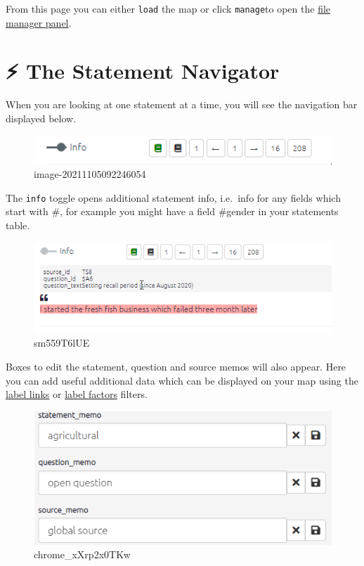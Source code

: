 \documentclass[
]{book}
\begin{document}
From this page you can either \texttt{load} the map or click \texttt{manage}to open the \protect\hyperlink{xpermissions}{file manager panel}.

\hypertarget{xstatement-nav}{%
\chapter{⚡ The Statement Navigator}\label{xstatement-nav}}

When you are looking at one statement at a time, you will see the navigation bar displayed below.

\begin{figure}
\centering
\includegraphics{_assets/image-20211105092246054.png}
\caption{image-20211105092246054}
\end{figure}

The \texttt{info} toggle opens additional statement info, i.e.~info for any fields which start with \#, for example you might have a field \#gender in your statements table.

\begin{figure}
\centering
\includegraphics{_assets/sm559T6lUE.gif}
\caption{sm559T6lUE}
\end{figure}

Boxes to edit the statement, question and source memos will also appear. Here you can add useful additional data which can be displayed on your map using the \href{xformatting-links}{label links} or \protect\hyperlink{xlabel-factors}{label factors} filters.

\begin{figure}
\centering
\includegraphics[width=6.77083in,height=\textheight]{_assets/chrome_xXrp2x0TKw.png}
\caption{chrome\_xXrp2x0TKw}
\end{figure}
\end{document}
